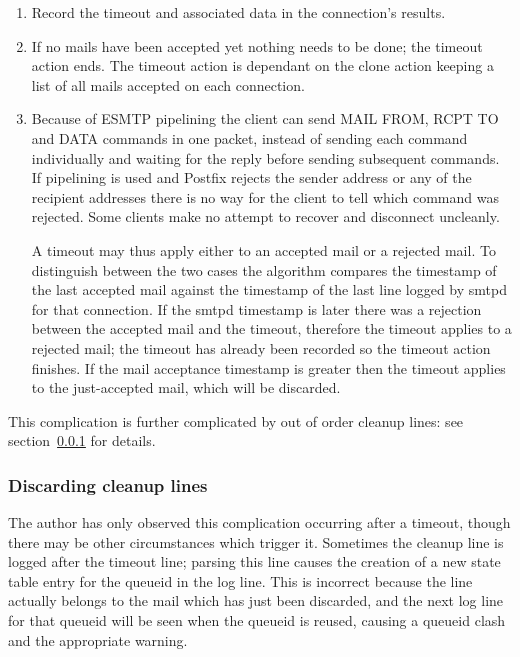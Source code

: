 \documentclass[a4paper,12pt,draft]{article}
\begin{document}
\begin{enumerate}

    \item Record the timeout and associated data in the connection's
        results.

    \item If no mails have been accepted yet nothing needs to be done; the
        timeout action ends.  The timeout action is dependant on the clone
        action keeping a list of all mails accepted on each connection.

    \item Because of ESMTP pipelining the client can send MAIL FROM, RCPT
        TO and DATA commands in one packet, instead of sending each command
        individually and waiting for the reply before sending subsequent
        commands.  If pipelining is used and Postfix rejects the sender
        address or any of the recipient addresses there is no way for the
        client to tell which command was rejected.  Some clients make no
        attempt to recover and disconnect uncleanly.

        A timeout may thus apply either to an accepted mail or a rejected
        mail.  To distinguish between the two cases the algorithm compares
        the timestamp of the last accepted mail against the timestamp of
        the last line logged by smtpd for that connection.  If the smtpd
        timestamp is later there was a rejection between the accepted mail
        and the timeout, therefore the timeout applies to a rejected mail;
        the timeout has already been recorded so the timeout action
        finishes.  If the mail acceptance timestamp is greater then the
        timeout applies to the just-accepted mail, which will be discarded.

\end{enumerate}

This complication is further complicated by out of order cleanup lines: see
section~\ref{discarding cleanup lines} for details.

\subsubsection{Discarding cleanup lines}

\label{discarding cleanup lines}

The author has only observed this complication occurring after a timeout,
though there may be other circumstances which trigger it.  Sometimes the
cleanup line is logged after the timeout line; parsing this line causes the
creation of a new state table entry for the queueid in the log line.  This
is incorrect because the line actually belongs to the mail which has just
been discarded, and the next log line for that queueid will be seen when
the queueid is reused, causing a queueid clash and the appropriate warning.
\end{document}
